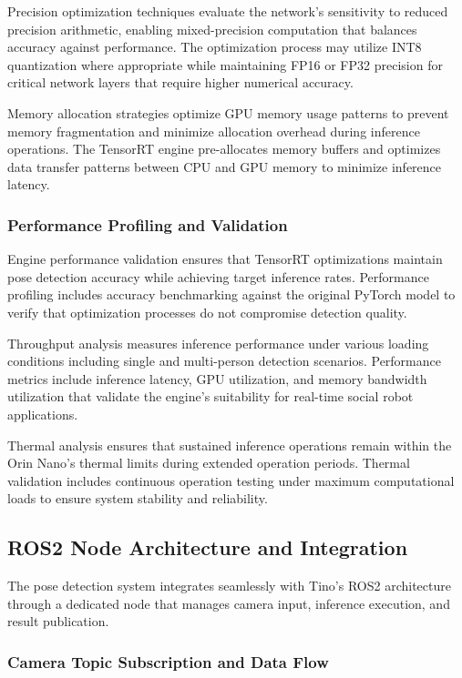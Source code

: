 Precision optimization techniques evaluate the network's sensitivity to reduced precision arithmetic, enabling mixed-precision computation that balances accuracy against performance. The optimization process may utilize INT8 quantization where appropriate while maintaining FP16 or FP32 precision for critical network layers that require higher numerical accuracy.

Memory allocation strategies optimize GPU memory usage patterns to prevent memory fragmentation and minimize allocation overhead during inference operations. The TensorRT engine pre-allocates memory buffers and optimizes data transfer patterns between CPU and GPU memory to minimize inference latency.

\subsubsection{Performance Profiling and Validation}

Engine performance validation ensures that TensorRT optimizations maintain pose detection accuracy while achieving target inference rates. Performance profiling includes accuracy benchmarking against the original PyTorch model to verify that optimization processes do not compromise detection quality.

Throughput analysis measures inference performance under various loading conditions including single and multi-person detection scenarios. Performance metrics include inference latency, GPU utilization, and memory bandwidth utilization that validate the engine's suitability for real-time social robot applications.

Thermal analysis ensures that sustained inference operations remain within the Orin Nano's thermal limits during extended operation periods. Thermal validation includes continuous operation testing under maximum computational loads to ensure system stability and reliability.

\subsection{ROS2 Node Architecture and Integration}

The pose detection system integrates seamlessly with Tino's ROS2 architecture through a dedicated node that manages camera input, inference execution, and result publication.

\subsubsection{Camera Topic Subscription and Data Flow}

